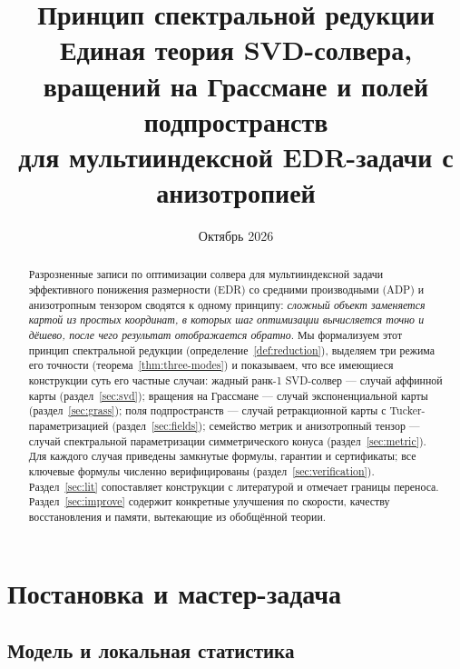 \documentclass[11pt,a4paper]{article}
\title{\textbf{Принцип спектральной редукции}\\[2pt]
\large Единая теория SVD-солвера, вращений на Грассмане и полей подпространств\\
для мультииндексной EDR-задачи с анизотропией}
\author{}
\date{Октябрь 2026}
\theoremstyle{plain}
\theoremstyle{definition}
\theoremstyle{remark}
\begin{document}
\maketitle

\begin{abstract}
\noindent
Разрозненные записи по оптимизации солвера для мультииндексной задачи эффективного
понижения размерности (EDR) со средними производными (ADP) и анизотропным тензором
сводятся к одному принципу: \emph{сложный объект заменяется картой из простых
координат, в которых шаг оптимизации вычисляется точно и дёшево, после чего
результат отображается обратно}. Мы формализуем этот принцип спектральной редукции
(определение~\ref{def:reduction}), выделяем три режима его точности
(теорема~\ref{thm:three-modes}) и показываем, что все имеющиеся конструкции суть его
частные случаи: жадный ранк-1 SVD-солвер --- случай аффинной карты
(раздел~\ref{sec:svd}); вращения на Грассмане --- случай экспоненциальной карты
(раздел~\ref{sec:grass}); поля подпространств --- случай ретракционной карты с
Tucker-параметризацией (раздел~\ref{sec:fields}); семейство метрик и анизотропный
тензор --- случай спектральной параметризации симметрического конуса
(раздел~\ref{sec:metric}). Для каждого случая приведены замкнутые формулы,
гарантии и сертификаты; все ключевые формулы численно верифицированы
(раздел~\ref{sec:verification}). Раздел~\ref{sec:lit} сопоставляет конструкции с
литературой и отмечает границы переноса. Раздел~\ref{sec:improve} содержит
конкретные улучшения по скорости, качеству восстановления и памяти, вытекающие из
обобщённой теории.
\end{abstract}

\tableofcontents
\bigskip

\section{Постановка и мастер-задача}\label{sec:master}

\subsection{Модель и локальная статистика}
\end{document}
